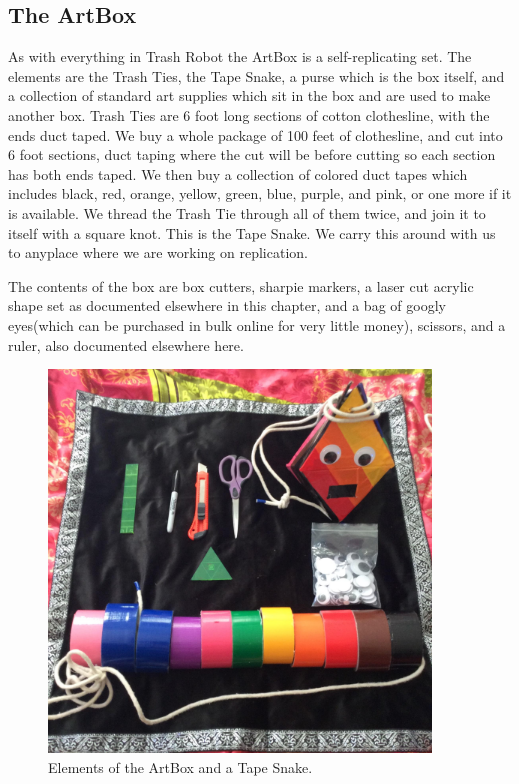\subsection{The ArtBox}

As with everything in Trash Robot the ArtBox is a self-replicating set.  The elements are the Trash Ties, the Tape Snake, a purse which is the box itself, and a collection of standard art supplies which sit in the box and are used to make another box.  Trash Ties are 6 foot long sections of cotton clothesline, with the ends duct taped.  We buy a whole package of 100 feet of clothesline, and cut into 6 foot sections, duct taping where the cut will be before cutting so each section has both ends taped.  We then buy a collection of colored duct tapes which includes black, red, orange, yellow, green, blue, purple, and pink, or one more if it is available.  We thread the Trash Tie through all of them twice, and join it to itself with a square knot.  This is the Tape Snake.  We carry this around with us to anyplace where we are working on replication. 

The contents of the box are box cutters, sharpie markers, a laser cut acrylic shape set as documented elsewhere in this chapter, and a bag of googly eyes(which can be purchased in bulk online for very little money), scissors, and a ruler, also documented elsewhere here.


\begin{figure}
	\centering
	\includegraphics[width=4in]{figures/artboxelements.jpg}
	\caption[artboxelements]
	{Elements of the ArtBox and a Tape Snake.}
\end{figure}


